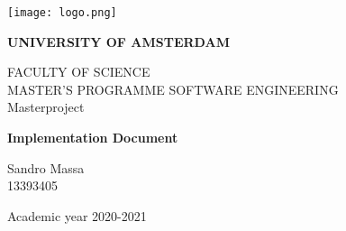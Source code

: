 \thispagestyle{empty}
\begin{titlepage}
  \begin{center}
    \texttt{[image: logo.png]}
  \end{center}
  \bfseries{
    \begin{center}
      \large
     \textbf{UNIVERSITY OF AMSTERDAM}\\
      \normalsize
      
      \vspace*{.5truecm}
      FACULTY OF SCIENCE\\
      \vspace*{.5truecm}
      MASTER'S PROGRAMME SOFTWARE ENGINEERING\\
      \vspace*{2truecm} \large
      Masterproject

     
        
      \LARGE
      \textbf{{Implementation Document}}\\



    \end{center}
    \vspace*{2.5truecm} \large
    \begin{flushleft}


      Sandro Massa\\
      13393405\\

    \end{flushleft}
    \vspace*{0.7truecm}
    \begin{center}
      Academic year 2020-2021
    \end{center} \clearpage
  }
\end{titlepage}